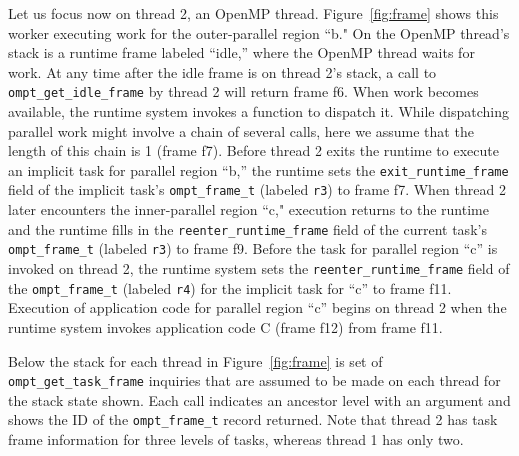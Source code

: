 \documentclass{article}
\begin{document}
Let us focus now on thread 2, an OpenMP thread. Figure~\ref{fig:frame}  shows this worker executing  work for the outer-parallel region ``b."
On the OpenMP thread's stack is a runtime frame labeled ``idle,'' where the OpenMP thread waits for work. 
At any time after the idle frame is on thread 2's stack, a call to \verb|ompt_get_idle_frame| by thread 2 will return frame f6. 
When work becomes available, the runtime system invokes a function to dispatch it. While dispatching parallel work might involve a chain of several calls, here we assume that the length of this chain is 1 (frame f7).  Before thread 2 exits the runtime to execute an implicit task for parallel region ``b,'' the runtime 
sets the \verb|exit_runtime_frame| field of the implicit task's \verb|ompt_frame_t| (labeled \verb|r3|) to frame f7. 
When thread 2 later encounters the inner-parallel region ``c,"  execution returns to the runtime and the runtime fills in the  \verb|reenter_runtime_frame| field of the current task's \verb|ompt_frame_t| (labeled \verb|r3|) to frame f9. Before the task for parallel region ``c'' is invoked on thread 2, the runtime system sets the \verb|reenter_runtime_frame| field  of the \verb|ompt_frame_t| (labeled \verb|r4|) for the implicit task for ``c'' 
to frame f11. Execution of application code for parallel region ``c''  begins on thread 2  when the runtime system invokes application code C (frame f12) from frame f11.


Below the stack for each thread in Figure~\ref{fig:frame}  is set of \verb|ompt_get_task_frame| inquiries that are assumed to be made on each thread for the stack state shown. Each call indicates an ancestor level with an argument and shows the ID of the \verb|ompt_frame_t| record returned. Note that thread 2 has task frame information for three levels of tasks, whereas thread 1 has only two.
\end{document}
